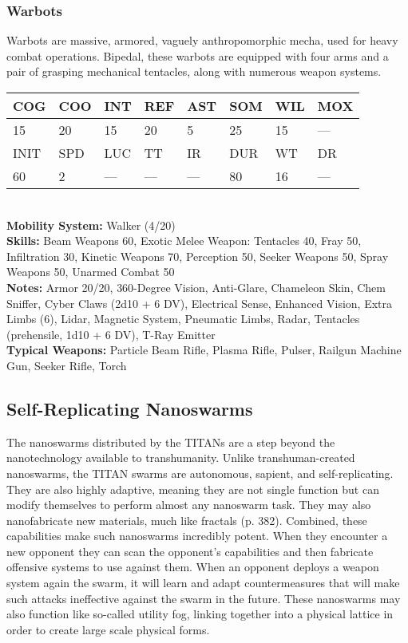 \subsubsection{Warbots} 

Warbots are massive, armored, vaguely anthropomorphic mecha, used for heavy combat operations. Bipedal, these warbots are equipped with four arms and a pair of grasping mechanical tentacles, along with numerous weapon systems. \\ \begin{tabular}{|l|l|l|l|l|l|l|l|} \hline

COG &COO &INT &REF &AST &SOM &WIL &MOX \\ \hline

15 &20 &15 &20 &5 &25 &15 &— \\ \hline

INIT &SPD &LUC &TT &IR &DUR &WT &DR \\ \hline

60 &2 &— &— &— &80 &16 &— \\ \hline

\end{tabular} \\ \textbf{Mobility System: }Walker (4/20) \\ \textbf{Skills:} Beam Weapons 60, Exotic Melee Weapon: Tentacles 40, Fray 50, Infiltration 30, Kinetic Weapons 70, Perception 50, Seeker Weapons 50, Spray Weapons 50, Unarmed Combat 50 \\ \textbf{Notes:} Armor 20/20, 360-Degree Vision, Anti-Glare, Chameleon Skin, Chem Sniffer, Cyber Claws (2d10 + 6 DV), Electrical Sense, Enhanced Vision, Extra Limbs (6), Lidar, Magnetic System, Pneumatic Limbs, Radar, Tentacles (prehensile, 1d10 + 6 DV), T-Ray Emitter \\ \textbf{Typical Weapons:} Particle Beam Rifle, Plasma Rifle, Pulser, Railgun Machine Gun, Seeker Rifle, Torch 



\subsection{Self-Replicating Nanoswarms} 

The nanoswarms distributed by the TITANs are a step beyond the nanotechnology available to transhumanity. Unlike transhuman-created nanoswarms, the TITAN swarms are autonomous, sapient, and self-replicating. They are also highly adaptive, meaning they are not single function but can modify themselves to perform almost any nanoswarm task. They may also nanofabricate new materials, much like fractals (p. 382). Combined, these capabilities make such nanoswarms incredibly potent. When they encounter a new opponent they can scan the opponent's capabilities and then fabricate offensive systems to use against them. When an opponent deploys a weapon system again the swarm, it will learn and adapt countermeasures that will make such attacks ineffective against the swarm in the future. These nanoswarms may also function like so-called utility fog, linking together into a physical lattice in order to create large scale physical forms. 

